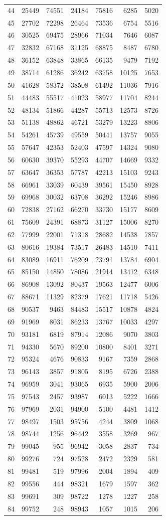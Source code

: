 \documentclass[]{article}
\begin{document}
\begin{longtable}[]{@{}rrrrrrr@{}}
44 & 25449 & 74551 & 24184 & 75816 & 6285 & 5020\tabularnewline
45 & 27702 & 72298 & 26464 & 73536 & 6754 & 5516\tabularnewline
46 & 30525 & 69475 & 28966 & 71034 & 7646 & 6087\tabularnewline
47 & 32832 & 67168 & 31125 & 68875 & 8487 & 6780\tabularnewline
48 & 36152 & 63848 & 33865 & 66135 & 9479 & 7192\tabularnewline
49 & 38714 & 61286 & 36242 & 63758 & 10125 & 7653\tabularnewline
50 & 41628 & 58372 & 38508 & 61492 & 11036 & 7916\tabularnewline
51 & 44483 & 55517 & 41023 & 58977 & 11704 & 8244\tabularnewline
52 & 48134 & 51866 & 44287 & 55713 & 12573 & 8726\tabularnewline
53 & 51138 & 48862 & 46721 & 53279 & 13223 & 8806\tabularnewline
54 & 54261 & 45739 & 49559 & 50441 & 13757 & 9055\tabularnewline
55 & 57647 & 42353 & 52403 & 47597 & 14324 & 9080\tabularnewline
56 & 60630 & 39370 & 55293 & 44707 & 14669 & 9332\tabularnewline
57 & 63647 & 36353 & 57787 & 42213 & 15103 & 9243\tabularnewline
58 & 66961 & 33039 & 60439 & 39561 & 15450 & 8928\tabularnewline
59 & 69968 & 30032 & 63708 & 36292 & 15246 & 8986\tabularnewline
60 & 72838 & 27162 & 66270 & 33730 & 15177 & 8609\tabularnewline
61 & 75609 & 24391 & 68873 & 31127 & 15006 & 8270\tabularnewline
62 & 77999 & 22001 & 71318 & 28682 & 14538 & 7857\tabularnewline
63 & 80616 & 19384 & 73517 & 26483 & 14510 & 7411\tabularnewline
64 & 83089 & 16911 & 76209 & 23791 & 13784 & 6904\tabularnewline
65 & 85150 & 14850 & 78086 & 21914 & 13412 & 6348\tabularnewline
66 & 86908 & 13092 & 80437 & 19563 & 12477 & 6006\tabularnewline
67 & 88671 & 11329 & 82379 & 17621 & 11718 & 5426\tabularnewline
68 & 90537 & 9463 & 84483 & 15517 & 10878 & 4824\tabularnewline
69 & 91969 & 8031 & 86233 & 13767 & 10033 & 4297\tabularnewline
70 & 93181 & 6819 & 87914 & 12086 & 9070 & 3803\tabularnewline
71 & 94330 & 5670 & 89200 & 10800 & 8401 & 3271\tabularnewline
72 & 95324 & 4676 & 90833 & 9167 & 7359 & 2868\tabularnewline
73 & 96143 & 3857 & 91805 & 8195 & 6726 & 2388\tabularnewline
74 & 96959 & 3041 & 93065 & 6935 & 5900 & 2006\tabularnewline
75 & 97543 & 2457 & 93987 & 6013 & 5222 & 1666\tabularnewline
76 & 97969 & 2031 & 94900 & 5100 & 4481 & 1412\tabularnewline
77 & 98497 & 1503 & 95756 & 4244 & 3809 & 1068\tabularnewline
78 & 98744 & 1256 & 96442 & 3558 & 3269 & 967\tabularnewline
79 & 99045 & 955 & 96942 & 3058 & 2837 & 734\tabularnewline
80 & 99276 & 724 & 97528 & 2472 & 2329 & 581\tabularnewline
81 & 99481 & 519 & 97996 & 2004 & 1894 & 409\tabularnewline
82 & 99556 & 444 & 98321 & 1679 & 1597 & 362\tabularnewline
83 & 99691 & 309 & 98722 & 1278 & 1227 & 258\tabularnewline
84 & 99752 & 248 & 98943 & 1057 & 1015 & 206\tabularnewline

\end{longtable}
\end{document}
